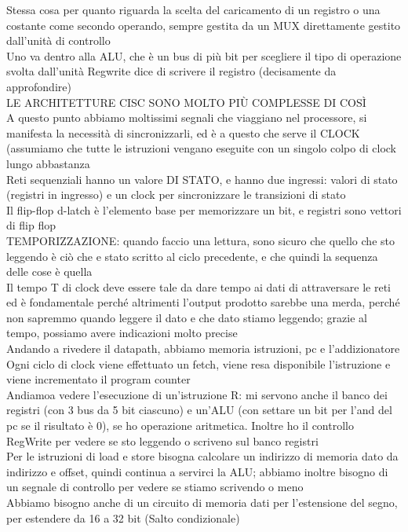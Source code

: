 \documentclass[class=book, crop=false, oneside]{standalone}
\begin{document}
Stessa cosa per quanto riguarda la scelta del caricamento di un registro o una costante come secondo operando, sempre gestita da un MUX direttamente gestito dall’unità di controllo\\

Uno va dentro alla ALU, che è un bus di più bit per scegliere il tipo di operazione svolta dall’unità
Regwrite dice di scrivere il registro (decisamente da approfondire)\\

LE ARCHITETTURE CISC SONO MOLTO PIÙ COMPLESSE DI COSÌ\\

A questo punto abbiamo moltissimi segnali che viaggiano nel processore, si manifesta la necessità di sincronizzarli, ed è a questo che serve il CLOCK (assumiamo che tutte le istruzioni vengano eseguite con un singolo colpo di clock lungo abbastanza\\

Reti sequenziali hanno un valore DI STATO, e hanno due ingressi: valori di stato (registri in ingresso) e un clock per sincronizzare le transizioni di stato\\

Il flip-flop d-latch è l’elemento base per memorizzare un bit, e registri sono vettori di flip flop\\

TEMPORIZZAZIONE: quando faccio una lettura, sono sicuro che quello che sto leggendo è ciò che e stato scritto al ciclo precedente, e che quindi la sequenza delle cose è quella\\

Il tempo T di clock deve essere tale da dare tempo ai dati di attraversare le reti ed è fondamentale perché altrimenti l’output prodotto sarebbe una merda, perché non sapremmo quando leggere il dato e che dato stiamo leggendo; grazie al tempo, possiamo avere indicazioni molto precise\\

Andando a rivedere il datapath, abbiamo memoria istruzioni, pc e l’addizionatore\\

Ogni ciclo di clock viene effettuato un fetch, viene resa disponibile l’istruzione e viene incrementato il program counter\\

Andiamoa  vedere l’esecuzione di un’istruzione R: mi servono anche il banco dei registri (con 3 bus da 5 bit ciascuno) e un’ALU (con settare un bit per l’and del pc se il risultato è 0), se ho operazione aritmetica. Inoltre ho il controllo RegWrite per vedere se sto leggendo o scriveno sul banco registri\\

Per le istruzioni di load e store bisogna calcolare un indirizzo di memoria dato da indirizzo e offset, quindi continua a servirci la ALU; abbiamo inoltre bisogno di un segnale di controllo per vedere se stiamo scrivendo o meno\\

Abbiamo bisogno anche di un circuito di memoria dati per l’estensione del segno, per estendere da 16 a 32 bit
(Salto condizionale)
\end{document}
